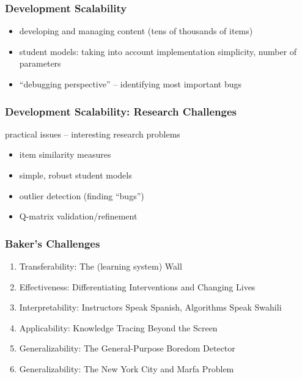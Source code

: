 \documentclass[bigger]{beamer}
\begin{document}
\begin{frame}
  \frametitle{Development Scalability}

  \begin{itemize}
  \item developing and managing content (tens of thousands of items)
  \item student models: taking into account implementation simplicity, number
    of parameters
  \item ``debugging perspective'' -- identifying most important bugs
  \end{itemize}
\end{frame}

\begin{frame}
  \frametitle{Development Scalability: Research Challenges}

  practical issues -- interesting research problems

  \begin{itemize}
  \item item similarity measures
  \item simple, robust student models
  \item outlier detection (finding ``bugs'')
  \item Q-matrix validation/refinement
  \end{itemize}
\end{frame}

\begin{frame}
  \frametitle{Baker's Challenges}

  \begin{enumerate}
  \item Transferability: The (learning system) Wall
  \item Effectiveness: Differentiating Interventions and Changing Lives 
  \item Interpretability: Instructors Speak Spanish, Algorithms Speak Swahili
  \item Applicability: Knowledge Tracing Beyond the Screen
  \item Generalizability: The General-Purpose Boredom Detector
  \item Generalizability: The New York City and Marfa Problem
  \end{enumerate}
\end{frame}
\end{document}
